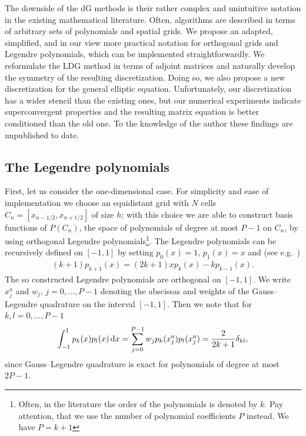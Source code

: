 The downside of the dG methods is their rather complex and unintuitive notation 
in the existing mathematical literature. Often, algorithms
are described in terms of arbitrary sets of polynomials and spatial grids. 
We propose an adapted, simplified, and in our view more practical notation for orthogonal grids and Legendre polynomials, which can be implemented straightforwardly.
We reformulate the LDG method in terms of adjoint matrices and
 naturally develop the symmetry of the resulting discretization.
Doing so, we also propose a new discretization for the general elliptic equation. 
Unfortunately, our discretization has a wider stencil than the existing ones, but 
our numerical experiments indicate superconvergent properties and the resulting
matrix equation is better conditioned than the old one. To the knowledge
of the author these findings are unpublished to date.

\subsection{ The Legendre polynomials} \label{sec:legendre}
First, let us consider the one-dimensional case.
For simplicity and ease of implementation we choose an equidistant grid with $N$ cells $C_n = [x_{n-1/2},x_{n+1/2}]$ of size $h$;
with this choice we are able to construct basis functions of $P(C_n)$, the space of 
polynomials of degree at most $P-1$ on $C_n$, by using orthogonal Legendre polynomials\footnote{ Often, in the literature the order of the polynomials is denoted by $k$.
Pay attention, that we use the number of polynomial coefficients $P$ instead. We have $P=k+1$}. 
The Legendre polynomials can be recursively defined on $[-1,1]$ by setting
$p_0(x) = 1$, $p_1(x) = x$ and (see e.g.~\cite{AS})
\begin{align}
    (k+1)p_{k+1}(x) = (2k+1)xp_k(x) - kp_{k-1}(x).
    \label{eq:recursion}
\end{align}
The so constructed Legendre polynomials are orthogonal on $[-1,1]$.
We write 
$x^a_j$ and $w_j$, $j=0,\dots,P-1$ denoting the abscissas and weights of 
the Gauss--Legendre quadrature on the interval $[-1,1]$. Then we note that for $k,l=0, \dots, P-1$
\begin{align}
    \int_{-1}^1 p_k(x)p_l(x) \,\mathrm{d}x = \sum_{j=0}^{P-1} w_jp_k (x^a_j)p_l(x^a_j) = \frac{2}{2k+1}\delta_{kl}, 
    \label{}
\end{align}
 since Gauss--Legendre quadrature is exact for polynomials of degree at most $2P-1$.

